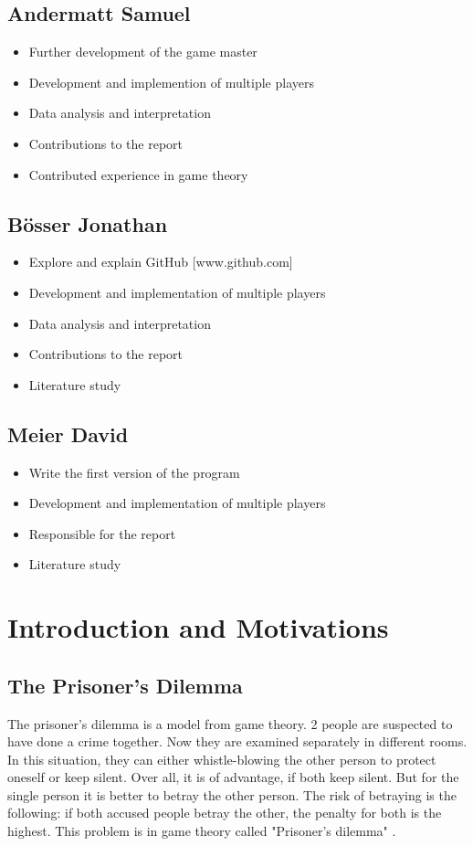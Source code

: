 \documentclass[11pt,twoside]{article}
\begin{document}
\subsection{Andermatt Samuel}
\begin{itemize}
\item Further development of the game master
\item Development and implemention of multiple players 
\item Data analysis and interpretation
\item Contributions to the report
\item Contributed experience in game theory
\end{itemize}

\subsection{B\"osser Jonathan}
\begin{itemize}
\item Explore and explain GitHub [www.github.com]
\item Development and implementation of multiple players 
\item Data analysis and interpretation
\item Contributions to the report
\item Literature study
\end{itemize}

\subsection{Meier David}
\begin{itemize}
\item Write the first version of the program
\item Development and implementation of multiple players
\item Responsible for the report
\item Literature study
\end{itemize}

\clearpage

\section{Introduction and Motivations}
\subsection{The Prisoner's Dilemma}
The prisoner's dilemma is a model from game theory. 2 people are suspected to have done a crime together. Now they are examined separately in different rooms. In this situation, they can either whistle-blowing the other person to protect oneself or keep silent. Over all, it is of advantage, if both keep silent. But for the single person it is better to betray the other person. The risk of betraying is the following: if both accused people betray the other, the penalty for both is the highest. This problem is in game theory called "Prisoner's dilemma" \cite{stanford}.
\end{document}
